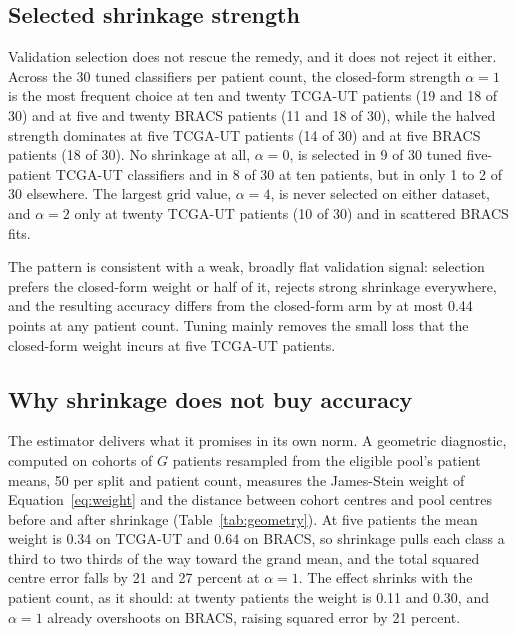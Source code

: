 \documentclass[11pt]{article}
\begin{document}
\subsection{Selected shrinkage strength}
\label{sec:alpha-results}
Validation selection does not rescue the remedy, and it does not reject it either. Across the 30 tuned classifiers per patient count, the closed-form strength $\alpha=1$ is the most frequent choice at ten and twenty TCGA-UT patients (19 and 18 of 30) and at five and twenty BRACS patients (11 and 18 of 30), while the halved strength dominates at five TCGA-UT patients (14 of 30) and at five BRACS patients (18 of 30). No shrinkage at all, $\alpha=0$, is selected in 9 of 30 tuned five-patient TCGA-UT classifiers and in 8 of 30 at ten patients, but in only 1 to 2 of 30 elsewhere. The largest grid value, $\alpha=4$, is never selected on either dataset, and $\alpha=2$ only at twenty TCGA-UT patients (10 of 30) and in scattered BRACS fits.

The pattern is consistent with a weak, broadly flat validation signal: selection prefers the closed-form weight or half of it, rejects strong shrinkage everywhere, and the resulting accuracy differs from the closed-form arm by at most 0.44 points at any patient count. Tuning mainly removes the small loss that the closed-form weight incurs at five TCGA-UT patients.

\subsection{Why shrinkage does not buy accuracy}
\label{sec:geometry-results}
The estimator delivers what it promises in its own norm. A geometric diagnostic, computed on cohorts of $G$ patients resampled from the eligible pool's patient means, 50 per split and patient count, measures the James-Stein weight of Equation~\ref{eq:weight} and the distance between cohort centres and pool centres before and after shrinkage (Table~\ref{tab:geometry}). At five patients the mean weight is 0.34 on TCGA-UT and 0.64 on BRACS, so shrinkage pulls each class a third to two thirds of the way toward the grand mean, and the total squared centre error falls by 21 and 27 percent at $\alpha=1$. The effect shrinks with the patient count, as it should: at twenty patients the weight is 0.11 and 0.30, and $\alpha=1$ already overshoots on BRACS, raising squared error by 21 percent.
\end{document}
